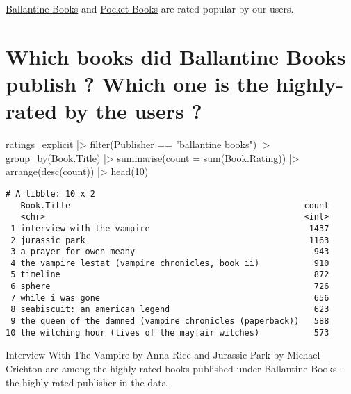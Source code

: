 \documentclass[
]{report}
\newenvironment{Shaded}{\begin{snugshade}}{\end{snugshade}}
\newcommand{\AttributeTok}[1]{\textcolor[rgb]{0.40,0.45,0.13}{#1}}
\newcommand{\DecValTok}[1]{\textcolor[rgb]{0.68,0.00,0.00}{#1}}
\newcommand{\FunctionTok}[1]{\textcolor[rgb]{0.28,0.35,0.67}{#1}}
\newcommand{\NormalTok}[1]{\textcolor[rgb]{0.00,0.23,0.31}{#1}}
\newcommand{\SpecialCharTok}[1]{\textcolor[rgb]{0.37,0.37,0.37}{#1}}
\newcommand{\StringTok}[1]{\textcolor[rgb]{0.13,0.47,0.30}{#1}}
\begin{document}
\href{https://www.randomhousebooks.com/imprint/ballantine-books/}{Ballantine
Books} and \href{https://en.wikipedia.org/wiki/Pocket_Books}{Pocket
Books} are rated popular by our users.

\section{Which books did Ballantine Books publish ? Which one is the
highly-rated by the users
?}\label{which-books-did-ballantine-books-publish-which-one-is-the-highly-rated-by-the-users}

\begin{Shaded}
\begin{Highlighting}[]
\NormalTok{ratings\_explicit }\SpecialCharTok{|\textgreater{}} \FunctionTok{filter}\NormalTok{(Publisher }\SpecialCharTok{==} \StringTok{"ballantine books"}\NormalTok{) }\SpecialCharTok{|\textgreater{}} 
                     \FunctionTok{group\_by}\NormalTok{(Book.Title) }\SpecialCharTok{|\textgreater{}}
                     \FunctionTok{summarise}\NormalTok{(}\AttributeTok{count =} \FunctionTok{sum}\NormalTok{(Book.Rating)) }\SpecialCharTok{|\textgreater{}} 
                     \FunctionTok{arrange}\NormalTok{(}\FunctionTok{desc}\NormalTok{(count)) }\SpecialCharTok{|\textgreater{}} \FunctionTok{head}\NormalTok{(}\DecValTok{10}\NormalTok{)}
\end{Highlighting}
\end{Shaded}

\begin{verbatim}
# A tibble: 10 x 2
   Book.Title                                               count
   <chr>                                                    <int>
 1 interview with the vampire                                1437
 2 jurassic park                                             1163
 3 a prayer for owen meany                                    943
 4 the vampire lestat (vampire chronicles, book ii)           910
 5 timeline                                                   872
 6 sphere                                                     726
 7 while i was gone                                           656
 8 seabiscuit: an american legend                             623
 9 the queen of the damned (vampire chronicles (paperback))   588
10 the witching hour (lives of the mayfair witches)           573
\end{verbatim}

Interview With The Vampire by Anna Rice and Jurassic Park by Michael
Crichton are among the highly rated books published under Ballantine
Books - the highly-rated publisher in the data.
\end{document}
